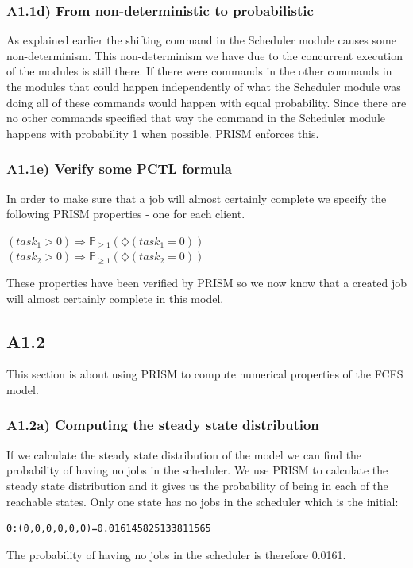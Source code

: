 \documentclass[12pt]{report}
\begin{document}
\subsubsection*{A1.1d) From non-deterministic to probabilistic}
As explained earlier the shifting command in the Scheduler module causes some non-determinism. This non-determinism we have due to the concurrent execution of the modules is still there. If there were commands in the other commands in the modules that could happen independently of what the Scheduler module was doing all of these commands would happen with equal probability. Since there are no other commands specified that way the command in the Scheduler module happens with probability 1 when possible. PRISM enforces this.

\subsubsection*{A1.1e) Verify some PCTL formula}
In order to make sure that a job will almost certainly complete we specify the following PRISM properties - one for each client.
\begin{center}
$(task_1 > 0) \Rightarrow \mathbb{P}_{\geq 1}(\diamondsuit(task_1 = 0))$\\
$(task_2 > 0) \Rightarrow \mathbb{P}_{\geq 1}(\diamondsuit(task_2 = 0))$
\end{center}
These properties have been verified by PRISM so we now know that a created job will almost certainly complete in this model.

\subsection*{A1.2}
This section is about using PRISM to compute numerical properties of the FCFS model.

\subsubsection*{A1.2a) Computing the steady state distribution}
If we calculate the steady state distribution of the model we can find the probability of having no jobs in the scheduler. We use PRISM to calculate the steady state distribution and it gives us the probability of being in each of the reachable states. Only one state has no jobs in the scheduler which is the initial:
\begin{lstlisting}[style=logoutput]
0:(0,0,0,0,0,0)=0.016145825133811565
\end{lstlisting}
The probability of having no jobs in the scheduler is therefore 0.0161.
\end{document}
